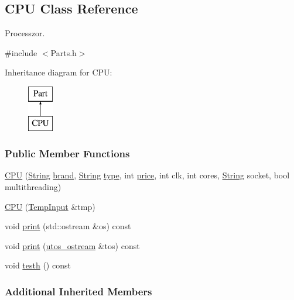 \subsection{C\+PU Class Reference}
\label{class_c_p_u}


Processzor.  




{\ttfamily \#include $<$Parts.\+h$>$}

Inheritance diagram for C\+PU\+:\begin{figure}[H]
\begin{center}
\leavevmode
\includegraphics[height=2.000000cm]{class_c_p_u}
\end{center}
\end{figure}
\subsubsection*{Public Member Functions}
\begin{DoxyCompactItemize}
\item 
\mbox{\hyperlink{class_c_p_u_a1aa85a6c976fe5b665dcb9fd6d8fdd1e}{C\+PU}} (\mbox{\hyperlink{class_string}{String}} \mbox{\hyperlink{class_part_ae06f2fdeb7fbbdb229a7aca151f3e341}{brand}}, \mbox{\hyperlink{class_string}{String}} \mbox{\hyperlink{class_part_a101dbcc5c4b21564df7414c7eb0eae88}{type}}, int \mbox{\hyperlink{class_part_a8e71223aed1da95a974f33d8d6c91bb1}{price}}, int clk, int cores, \mbox{\hyperlink{class_string}{String}} socket, bool multithreading)
\item 
\mbox{\hyperlink{class_c_p_u_a9147d84f815b9a242ba618877e6b2673}{C\+PU}} (\mbox{\hyperlink{struct_temp_input}{Temp\+Input}} \&tmp)
\item 
void \mbox{\hyperlink{class_c_p_u_ad4d3ebb288deeaad640e034bdb71a40a}{print}} (std\+::ostream \&os) const
\item 
void \mbox{\hyperlink{class_c_p_u_a0aea700bac0896b9e4434770737078d0}{print}} (\mbox{\hyperlink{structutos__ostream}{utos\+\_\+ostream}} \&tos) const
\item 
void \mbox{\hyperlink{class_c_p_u_a9e6b8807b179e06080d52f08e988bd57}{testh}} () const
\end{DoxyCompactItemize}
\subsubsection*{Additional Inherited Members}


